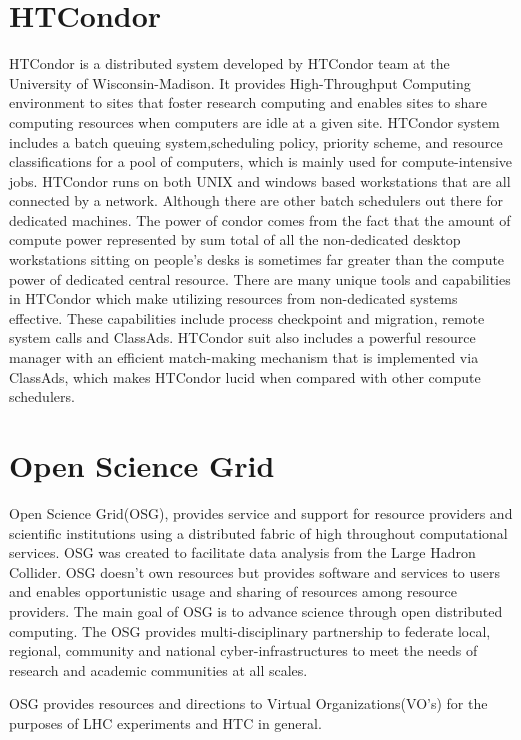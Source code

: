 \documentclass[ms,electronic,double]{nuthesis}
\begin{document}
\section{HTCondor} HTCondor is a distributed system developed by HTCondor team at the 
University of Wisconsin-Madison. It provides High-Throughput Computing environment to sites 
that foster research computing and enables sites to share computing resources when 
computers are idle at a given site. HTCondor system includes a batch queuing 
system,scheduling policy, priority scheme, and resource classifications for a pool of 
computers, which is mainly used for compute-intensive jobs. HTCondor runs on both
 UNIX and windows based workstations that are all connected by a network.  
Although there are other batch schedulers out there for dedicated machines. 
The power of condor comes from  the fact that  the amount of compute power 
represented by sum total of all the 
 non-dedicated desktop workstations sitting on people's desks is sometimes far 
 greater than the compute power of dedicated central resource. There are many 
 unique tools and capabilities in HTCondor which make utilizing resources from 
 non-dedicated systems effective. These capabilities include process checkpoint 
 and migration, remote system calls and ClassAds. HTCondor suit also includes a 
 powerful resource manager with an efficient match-making mechanism that is 
 implemented via ClassAds, which makes HTCondor lucid when compared with other 
 compute schedulers\cite{manual56}.
 
 
\section{Open Science Grid} Open Science Grid(OSG), provides service and support 
for resource providers and scientific institutions using a distributed fabric of 
high throughout computational services. OSG was created to facilitate data analysis from the 
Large Hadron Collider\cite{osg}. OSG doesn't own resources but provides software and services to 
users and enables opportunistic usage and sharing of resources among resource providers.
The main goal of OSG is to advance science through open distributed computing. 
The OSG provides multi-disciplinary partnership to federate local, regional, community and 
national cyber-infrastructures to meet the needs of research and academic communities at all scales.

OSG provides resources and directions to Virtual Organizations(VO's) for the purposes of LHC experiments
and HTC in general. \\
\end{document}
